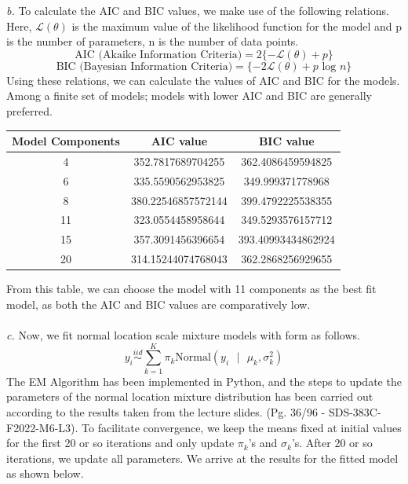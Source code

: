 \documentclass[11pt]{article}
\begin{document}
\emph{b.} To calculate the AIC and BIC values, we make use of the following relations. Here, $\mathcal{L}(\theta)$ is the maximum value of the likelihood function for the model and p is the number of parameters, n is the number of data points.
\begin{equation}
  \nonumber
  \text{AIC (Akaike Information Criteria)} = 2\{-\mathcal{L}(\theta) + p\}
\end{equation}
\begin{equation}
  \nonumber
  \text{BIC (Bayesian Information Criteria)} = \{-2\mathcal{L}(\theta) + p \text{ log }n\}
\end{equation}
Using these relations, we can calculate the values of AIC and BIC for the models. Among a finite set of models; models with lower AIC and BIC are generally preferred.
\begin{center}
\begin{tabular}{ |c|c|c| }
  \hline
 \textbf{Model Components} & \textbf{AIC value} & \textbf{BIC value}\\
 \hline
 4 & 352.7817689704255 & 362.4086459594825 \\
 \hline
 6 & 335.5590562953825 & 349.999371778968 \\
 \hline
 8 & 380.22546857572144 & 399.4792225538355 \\
 \hline
 11 & 323.0554458958644 & 349.5293576157712 \\
 \hline
 15 & 357.3091456396654 & 393.40993434862924 \\
 \hline
 20 & 314.15244074768043 & 362.2868256929655 \\
 \hline
\end{tabular}
\end{center}
From this table, we can choose the model with 11 components as the best fit model, as both the AIC and BIC values are comparatively low. \\ \\
\noindent \emph{c.} Now, we fit normal location scale mixture models with form as follows.
\begin{equation}
  \nonumber
  y_{i} \overset{iid}{\sim} \sum_{k = 1}^{K} \pi_{k} \text{Normal}(y_{i} \text{ } | \text{ } \mu_{k}, \sigma_{k}^2)
\end{equation}
The EM Algorithm has been implemented in Python, and the steps to update the parameters of the normal location mixture distribution has been carried out according to the results taken from the lecture slides. (Pg. 36/96 - SDS-383C-F2022-M6-L3). To facilitate convergence, we keep the means fixed at initial values for the first 20 or so iterations and only update $\pi_{k}$'s and $\sigma_k$'s. After 20 or so iterations, we update all parameters. We arrive at the results for the fitted model as shown below.
\end{document}
